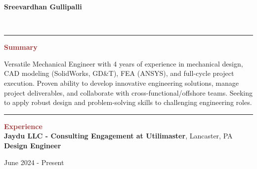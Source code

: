 \documentclass[11pt, letterpaper]{article}
\begin{document}
\begin{centering}
{\hfill{\huge \textbf{Sreevardhan Gullipalli}}\vspace{2pt}\hfill}
\end{centering}
\begin{flushleft}
%
\\ %
\end{flushleft}
\vspace{-8pt}
\noindent \rule[2pt]{\textwidth}{0.5pt} \vspace{-8mm}
\noindent \textbf{\large \textcolor{Brown}{Summary}}\vspace{2pt}\\
\begin{justify}
Versatile Mechanical Engineer with 4 years of experience in mechanical design, CAD modeling (SolidWorks, GD\&T), FEA (ANSYS), and full-cycle project execution. Proven ability to develop innovative engineering solutions, manage project deliverables, and collaborate with cross-functional/offshore teams. Seeking to apply robust design and problem-solving skills to challenging engineering roles.
\end{justify}
\vspace{-8pt}
\noindent \rule[2pt]{\textwidth}{0.5pt}
\noindent \textbf{\large \textcolor{Brown}{Experience}}\vspace{4pt}\\
\textbf{Jaydu LLC - Consulting Engagement at Utilimaster}, Lancaster, PA\\
\textbf{Design Engineer}\hfill \raggedright{June 2024 - Present}\\ %
\end{document}
